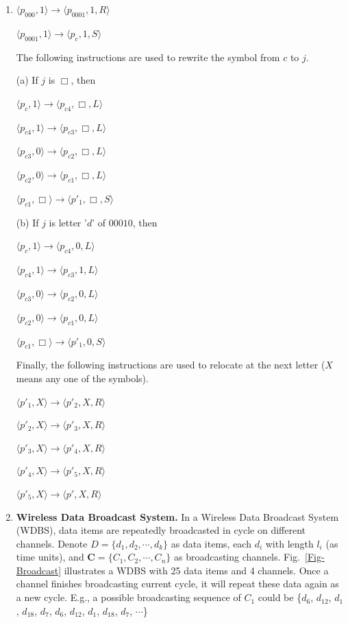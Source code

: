 \documentclass[12pt,a4paper]{article}
\makeatletter
\newtheorem*{solution}{Solution}
\theoremstyle{definition}
\renewenvironment{solution}[1][Solution] {\par\pushQED{\qed}\normalfont\topsep6\p@\@plus6\p@\relax\trivlist\item[\hskip\labelsep\bfseries#1\@addpunct{.}]\ignorespaces}{\popQED\endtrivlist\@endpefalse} \makeatother
\makeatother
\begin{document}
\begin{enumerate}
\begin{solution}
			$\langle p_{000},1 \rangle \rightarrow \langle p_{0001},1,R \rangle $
			
			$\langle p_{0001},1 \rangle \rightarrow \langle p_{c},1,S \rangle $
			
			The following instructions are used to rewrite the symbol from $c$ to $j$.
			
			(a) If $j$ is $\Box$, then
			
			$\langle p_{c},1 \rangle \rightarrow \langle p_{c4},\Box,L \rangle $
			
			$\langle p_{c4},1 \rangle \rightarrow \langle p_{c3},\Box,L \rangle $
			
			$\langle p_{c3},0 \rangle \rightarrow \langle p_{c2},\Box,L \rangle $
			
			$\langle p_{c2},0 \rangle \rightarrow \langle p_{c1},\Box,L \rangle $
			
			$\langle p_{c1},\Box \rangle \rightarrow \langle p'_1,\Box,S \rangle $
			
			(b) If $j$ is letter '$d$' of $00010$, then
			
			$\langle p_{c},1 \rangle \rightarrow \langle p_{c4},0,L \rangle $
			
			$\langle p_{c4},1 \rangle \rightarrow \langle p_{c3},1,L \rangle $
			
			$\langle p_{c3},0 \rangle \rightarrow \langle p_{c2},0,L \rangle $
			
			$\langle p_{c2},0 \rangle \rightarrow \langle p_{c1},0,L \rangle $
			
			$\langle p_{c1},\Box \rangle \rightarrow \langle p'_1,0,S \rangle $
			
			Finally, the following instructions are used to relocate at the next letter ($X$ means any one of the symbols).
			
			$\langle p'_1, X \rangle \rightarrow \langle p'_2,X,R \rangle $
			
			$\langle p'_2,X \rangle \rightarrow \langle p'_3,X,R \rangle $
			
			$\langle p'_3,X \rangle \rightarrow \langle p'_4,X,R \rangle $
			
			$\langle p'_4,X \rangle \rightarrow \langle p'_5,X,R \rangle $
			
			$\langle p'_5,X \rangle \rightarrow \langle p',X,R \rangle $
			
			
		\end{solution}
		
		\item \textbf{Wireless Data Broadcast System.}
		In a Wireless Data Broadcast System (WDBS), data items are repeatedly broadcasted in cycle on different channels. Denote $D = \{d_1, d_2,\cdots, d_k\}$ as data items, each $d_i$ with length $l_i$ (as time units), and $\mathbf{C}=\{C_1, C_2, \cdots, C_n\}$ as broadcasting channels. Fig.~\ref{Fig-Broadcast} illustrates a WDBS with 25 data items and 4 channels. Once a channel finishes broadcasting current cycle, it will repeat these data again as a new cycle. E.g., a possible broadcasting sequence of $C_1$ could be \{$d_6$, $d_{12}$, $d_1$, $d_{18}$, $d_7$, $d_6$, $d_{12}$, $d_1$, $d_{18}$, $d_7$, $\cdots$\}
		

\end{enumerate}
\end{document}
